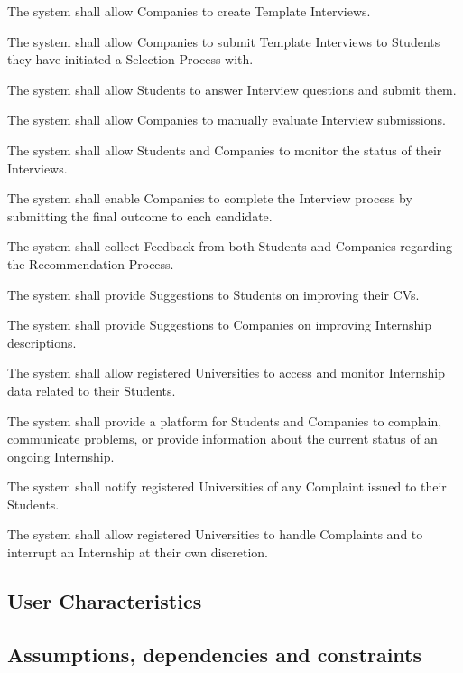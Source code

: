 \begin{enumerate}[label={\color{titleColor}[R\arabic*]}]
    \item The system shall allow Companies to create Template Interviews.
    \item The system shall allow Companies to submit Template Interviews to Students they have initiated a Selection Process with.
    \item The system shall allow Students to answer Interview questions and submit them.
    \item The system shall allow Companies to manually evaluate Interview submissions.
    \item The system shall allow Students and Companies to monitor the status of their Interviews.
    \item The system shall enable Companies to complete the Interview process by submitting the final outcome to each candidate.

    \item The system shall collect Feedback from both Students and Companies regarding the Recommendation Process.
    \item The system shall provide Suggestions to Students on improving their CVs.
    \item The system shall provide Suggestions to Companies on improving Internship descriptions.

    \item The system shall allow registered Universities to access and monitor Internship data related to their Students.
    \item The system shall provide a platform for Students and Companies to complain, communicate problems, or provide information about the current status of an ongoing Internship.
    \item The system shall notify registered Universities of any Complaint issued to their Students.
    \item The system shall allow registered Universities to handle Complaints and to interrupt an Internship at their own discretion.
\end{enumerate}

\subsection{User Characteristics}


\subsection{Assumptions, dependencies and constraints}

